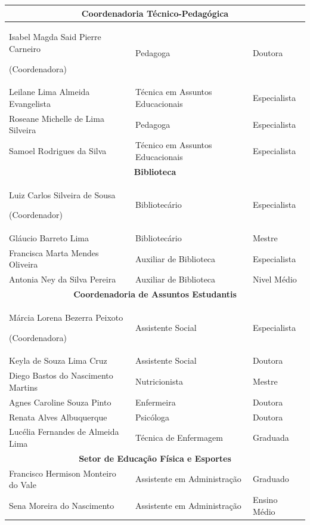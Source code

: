 \begin{longtable}{|p{6cm}|p{5.5cm}|p{2.3cm}|}
	\multicolumn{3}{|c|}{\textbf{Coordenadoria Técnico-Pedagógica}} \\
	\hline
	Isabel Magda Said Pierre Carneiro 
	
	(Coordenadora) & Pedagoga & Doutora \\ \hline
	Leilane Lima Almeida Evangelista & Técnica em Assuntos Educacionais & Especialista \\ \hline
	Roseane Michelle de Lima Silveira & Pedagoga & Especialista \\ \hline
	Samoel Rodrigues da Silva & Técnico em Assuntos Educacionais & Especialista \\ \hline
	
	\multicolumn{3}{|c|}{\textbf{Biblioteca}} \\
	\hline
	Luiz Carlos Silveira de Sousa 
	
	(Coordenador) & Bibliotecário & Especialista \\ \hline 
	Gláucio Barreto Lima & Bibliotecário & Mestre \\ \hline
	Francisca Marta Mendes Oliveira & Auxiliar de Biblioteca & Especialista \\ \hline 
	Antonia Ney da Silva Pereira & Auxiliar de Biblioteca & Nivel Médio \\ \hline
	
	\multicolumn{3}{|c|}{\textbf{Coordenadoria de Assuntos Estudantis}} \\
	\hline
	Márcia Lorena Bezerra Peixoto 
	
	(Coordenadora) & Assistente Social & Especialista \\ \hline
	Keyla de Souza Lima Cruz & Assistente Social & Doutora \\ \hline
	Diego Bastos do Nascimento Martins & Nutricionista & Mestre \\ \hline
	Agnes Caroline Souza Pinto & Enfermeira & Doutora \\ \hline
	Renata Alves Albuquerque & Psicóloga & Doutora \\ \hline
	Lucélia Fernandes de Almeida Lima & Técnica de Enfermagem & Graduada \\ \hline
	
	\multicolumn{3}{|c|}{\textbf{Setor de Educação Física e Esportes}} \\
	\hline
	Francisco Hermison Monteiro do Vale & Assistente em Administração & Graduado \\ \hline 
	Sena Moreira do Nascimento & Assistente em Administração & Ensino Médio  \\ \hline
	

\end{longtable}
